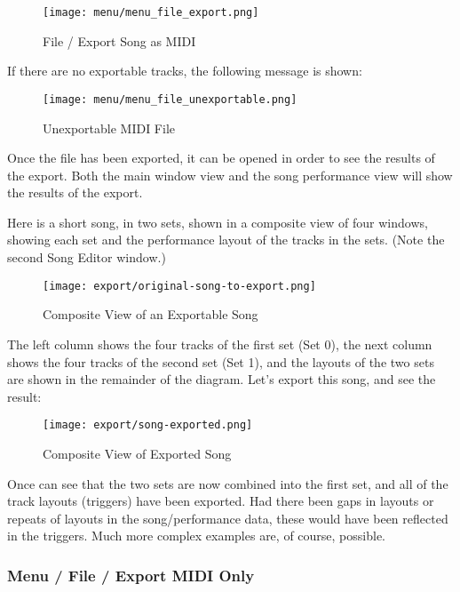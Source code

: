 \begin{figure}[H]
   \centering 
   \texttt{[image: menu/menu\_file\_export.png]}
   \caption{File / Export Song as MIDI}
   \label{fig:seq64_menu_file_export}
\end{figure}

   If there are no exportable tracks, the following message is shown:

\begin{figure}[H]
   \centering 
   \texttt{[image: menu/menu\_file\_unexportable.png]}
   \caption{Unexportable MIDI File}
   \label{fig:seq64_menu_file_unexportable}
\end{figure}

   Once the file has been exported, it can be opened in order to see
   the results of the export.  Both the main window view and the
   song performance view will show the results of the export.

   Here is a short song, in two sets, shown in a composite view of four windows,
   showing each set and the performance layout of the tracks in the sets.
   (Note the second Song Editor window.)

\begin{figure}[H]
   \centering 
   \texttt{[image: export/original-song-to-export.png]}
   \caption{Composite View of an Exportable Song}
   \label{fig:seq64_original_song_to_export}
\end{figure}

   The left column shows the four tracks of the first set (Set 0), the next
   column shows the four tracks of the second set (Set 1), and the
   layouts of the two sets are shown in the remainder of the diagram.
   Let's export this song, and see the result:

\begin{figure}[H]
   \centering 
   \texttt{[image: export/song-exported.png]}
   \caption{Composite View of Exported Song}
   \label{fig:seq64_song_exported}
\end{figure}

   Once can see that the two sets are now combined into the first set,
   and all of the track layouts (triggers) have been exported.
   Had there been gaps in layouts or repeats of layouts in the song/performance
   data, these would have been reflected in the triggers.
   Much more complex examples are, of course, possible.

\subsubsection{Menu / File / Export MIDI Only}
\label{subsubsec:seq64_menu_file_export_midi_only}

